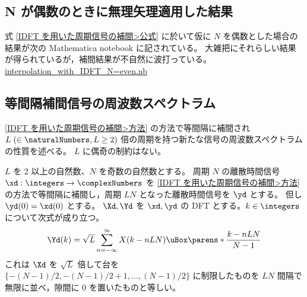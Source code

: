         \subsection{N が偶数のときに無理矢理適用した結果}
            \label{N が偶数のときに無理矢理適用した結果}
            式 \eqref{IDFT を用いた周期信号の補間>公式} に於いて仮に $N$ を偶数とした場合の結果が次の Mathematica notebook に記されている。
            大雑把にそれらしい結果が得られているが，補間結果が不自然に波打っている。\newline
            \href{\currfiledir/calc/Interpolation_with_IDFT/interpolation_with_IDFT_N=even/interpolation_with_IDFT_N=even.nb}{interpolation\_with\_IDFT\_N=even.nb}
        \subsection{等間隔補間信号の周波数スペクトラム}
            \ref{IDFT を用いた周期信号の補間>方法} の方法で等間隔に補間され $L\;(\in\naturalNumbers,L\geq 2)$ 倍の周期を持つ新たな信号の周波数スペクトラムの性質を述べる。
            $L$ に偶奇の制約はない。
            \begin{shadebox}
                $L$ を 2 以上の自然数、$N$ を奇数の自然数とする。
                周期 $N$ の離散時間信号 $\xd:\integers\to\complexNumbers$ を \ref{IDFT を用いた周期信号の補間>方法} の方法で等間隔に補間し，周期 $LN$ となった離散時間信号を $\yd$ とする。
                但し $\yd(0) = \xd(0)$ とする。
                $\Xd,\Yd$ を $\xd,\yd$ の DFT とする。$k\in\integers$ について次式が成り立つ。
                \[ \Yd(k) = \sqrt{L}\sum_{n=-\infty}^{\infty}X(k-nLN)\uBox\parens*{\frac{k-nLN}{N-1}} \]
                これは $\Xd$ を $\sqrt{L}$ 倍して台を $\{-(N-1)/2,-(N-1)/2+1,\dots,(N-1)/2\}$ に制限したものを $LN$ 間隔で無限に並べ，隙間に 0 を置いたものと等しい。
            \end{shadebox}

